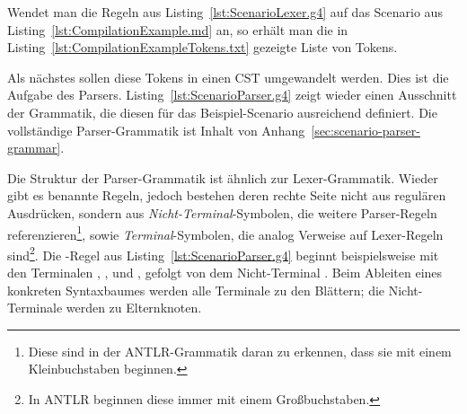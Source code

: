 Wendet man die Regeln aus Listing~\ref{lst:ScenarioLexer.g4} auf das Scenario aus Listing~\ref{lst:CompilationExample.md} an,
so erhält man die in Listing~\ref{lst:CompilationExampleTokens.txt} gezeigte Liste von Tokens.


Als nächstes sollen diese Tokens in einen CST umgewandelt werden.
Dies ist die Aufgabe des Parsers.
Listing~\ref{lst:ScenarioParser.g4} zeigt wieder einen Ausschnitt der Grammatik,
die diesen für das Beispiel-Scenario ausreichend definiert.
Die vollständige Parser-Grammatik ist Inhalt von Anhang~\ref{sec:scenario-parser-grammar}.


Die Struktur der Parser-Grammatik ist ähnlich zur Lexer-Grammatik.
Wieder gibt es benannte Regeln, jedoch bestehen deren rechte Seite nicht aus regulären Ausdrücken,
sondern aus \emph{Nicht-Terminal}-Symbolen, die weitere Parser-Regeln referenzieren\footnote{Diese sind in der ANTLR-Grammatik daran zu erkennen, dass sie mit einem Kleinbuchstaben beginnen.},
sowie \emph{Terminal}-Symbolen, die analog Verweise auf Lexer-Regeln sind\footnote{In ANTLR beginnen diese immer mit einem Großbuchstaben.}.
Die -Regel aus Listing~\ref{lst:ScenarioParser.g4} beginnt beispielsweise mit den Terminalen , ,  und , gefolgt von dem Nicht-Terminal .
Beim Ableiten eines konkreten Syntaxbaumes werden alle Terminale zu den Blättern;
die Nicht-Terminale werden zu Elternknoten.

